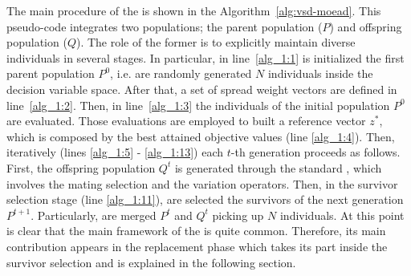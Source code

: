 The main procedure of the \VSDMOEAD{} is shown in the Algorithm~\ref{alg:vsd-moead}.
%
This pseudo-code integrates two populations; the parent population ($P$) and offspring population ($Q$).
%
The role of the former is to explicitly maintain diverse individuals in several stages.
%
In particular, in line~\ref{alg_1:1} is initialized the first parent population $P^0$, i.e. are randomly generated $N$ individuals inside the decision variable space.
%
After that, a set of spread weight vectors are defined in line~\ref{alg_1:2}.
%
Then, in line~\ref{alg_1:3} the individuals of the initial population $P^0$ are evaluated.
%
Those evaluations are employed to built a reference vector $z^*$, which is composed by the best attained objective values (line \ref{alg_1:4}).
%
Then, iteratively (lines \ref{alg_1:5} - \ref{alg_1:13}) each $t$-th generation proceeds as follows.
%
First, the offspring population $Q^t$ is generated through the standard \DE{}, which involves the mating selection and the variation operators.
%
Then, in the survivor selection stage (line \ref{alg_1:11}), are selected the survivors of the next generation $P^{t+1}$.
%
Particularly, are merged $P^t$ and $Q^t$ picking up $N$ individuals.
%
At this point is clear that the main framework of the \VSDMOEAD{} is quite common.
%
Therefore, its main contribution appears in the replacement phase which takes its part inside the survivor selection and is explained in the following section.
%

